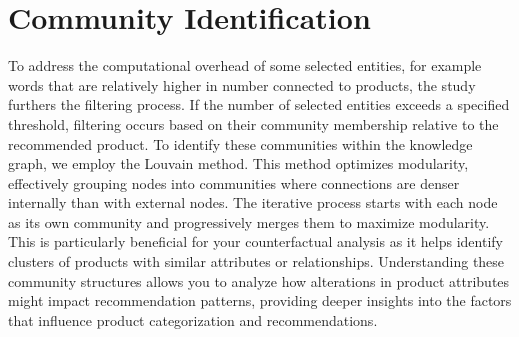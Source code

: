 \section{Community Identification}
To address the computational overhead of some selected entities, for example words that are relatively higher in number connected to products, the study furthers the filtering process. If the number of selected entities exceeds a specified threshold, filtering occurs based on their community membership relative to the recommended product.
To identify these communities within the knowledge graph, we employ the Louvain method. This method optimizes modularity, effectively grouping nodes into communities where connections are denser internally than with external nodes. The iterative process starts with each node as its own community and progressively merges them to maximize modularity. This is particularly beneficial for your counterfactual analysis as it helps identify clusters of products with similar attributes or relationships. Understanding these community structures allows you to analyze how alterations in product attributes might impact recommendation patterns, providing deeper insights into the factors that influence product categorization and recommendations.

